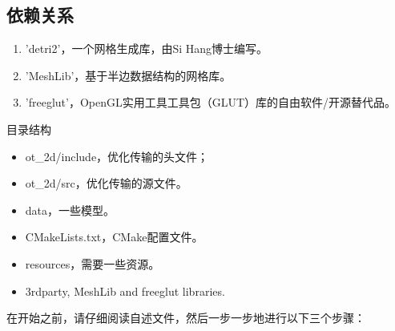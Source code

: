 \subsection{依赖关系}

\begin{enumerate}
    \item 'detri2'，一个网格生成库，由Si Hang博士编写。
    \item 'MeshLib'，基于半边数据结构的网格库。
    \item 'freeglut'，OpenGL实用工具工具包（GLUT）库的自由软件/开源替代品。
\end{enumerate}

目录结构
\begin{itemize}
    \item ot\_2d/include，优化传输的头文件；
    \item ot\_2d/src，优化传输的源文件。
    \item data，一些模型。
    \item CMakeLists.txt，CMake配置文件。
    \item resources，需要一些资源。
    \item 3rdparty, MeshLib and freeglut libraries.
\end{itemize}

在开始之前，请仔细阅读自述文件，然后一步一步地进行以下三个步骤：

